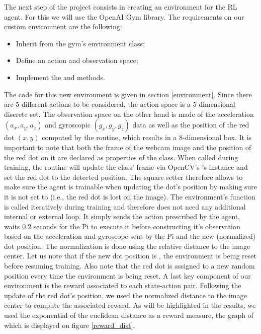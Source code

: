 The next step of the project consists in creating an environment for the RL agent. For this we will use the OpenAI Gym library. The requirements on our custom environment are the following:

\begin{itemize}
	\item Inherit from the gym's environment class;
	\item Define an action and observation space;
	\item Implement the \texttt{} and \texttt{} methods.
\end{itemize}

The code for this new environment is given in section \ref{environment}. Since there are 5 different actions to be considered, the action space is a 5-dimensional discrete set. The observation space on the other hand is made of the acceleration $(a_x, a_y, a_z)$ and gyroscopic $(g_x, g_y, g_z)$ data as well as the position of the red dot $(x,y)$ computed by the \texttt{} routine, which results in a 8-dimensional box. It is important to note that both the frame of the webcam image and the position of the red dot on it are declared as properties of the \texttt{} class. When called during training, the \texttt{} routine will update the class' frame via OpenCV's \texttt{}'s instance and set the red dot to the detected position. The square setter therefore allows to make sure the agent is trainable when updating the dot's position by making sure it is not set to \texttt{} (i.e., the red dot is lost on the image).
The environment's \texttt{} function is called iteratively during training and therefore does not need any additional internal or external \texttt{} loop. It simply sends the action prescribed by the agent, waits 0.2 seconds for the Pi to execute it before constructing it's observation based on the acceleration and gyroscope sent by the Pi and the new (normalized) dot position. The normalization is done using the relative distance to the image center. Let us note that if the new dot position is \texttt{}, the environment is being reset before resuming training. Also note that the red dot is assigned to a new random position every time the environment is being reset.
A last key component of our environment is the reward associated to each state-action pair. Following the update of the red dot's position, we used the normalized distance to the image center to compute the associated reward. As will be highlighted in the results, we used the exponential of the euclidean distance as a reward measure, the graph of which is displayed on figure \ref{reward_dist}.


